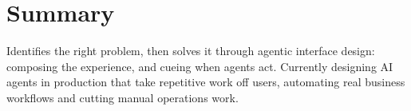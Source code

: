 \section{Summary}
    \begin{itemize}[leftmargin=0.15in, label={} ]
    \small{\item{
        Identifies the right problem, then solves it through agentic interface design: composing the experience, and cueing when agents act. Currently designing AI agents in production that take repetitive work off users, automating real business workflows and cutting manual operations work.
    }}
    \end{itemize}
